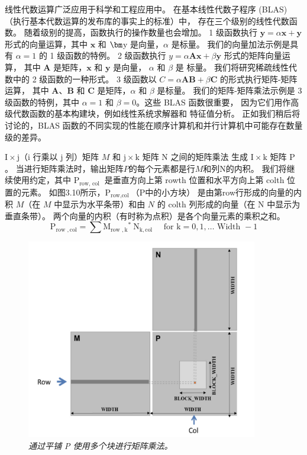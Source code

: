\begin{remark}[线性代数函数]
	线性代数运算广泛应用于科学和工程应用中。 在基本线性代数子程序 (BLAS)（执行基本代数运算的发布库的事实上的标准）中，
	存在三个级别的线性代数函数。 随着级别的提高，函数执行的操作数量也会增加。 
	1 级函数执行 $\bm y = \alpha \bm x+\bm y$ 形式的向量运算，其中 $\bm x$ 和 $\bm $y 是向量，$\alpha$ 是标量。 
	我们的向量加法示例是具有 $\alpha = 1$ 的 1 级函数的特例。
	2 级函数执行 $y = \alpha \bm A\bm x+\beta \bm y$ 形式的矩阵向量运算，
	其中 $\bm A$ 是矩阵，$\bm x$ 和 $\bm y$ 是向量，
	$\alpha$ 和 $\beta$ 是 标量。 我们将研究稀疏线性代数中的 2 级函数的一种形式。 
	3 级函数以 $C = \alpha \bm A\bm B + \beta \bm C$ 的形式执行矩阵-矩阵运算，
	其中 $\bm A$、$\bm B$ 和 $\bm C$ 是矩阵，$\alpha$ 和 $\beta$ 是标量。 
	我们的矩阵-矩阵乘法示例是 3 级函数的特例，其中 $\alpha = 1$ 和 $\beta = 0$。这些 BLAS 函数很重要，
	因为它们用作高级代数函数的基本构建块，例如线性系统求解器和 特征值分析。 
	正如我们稍后将讨论的，BLAS 函数的不同实现的性能在顺序计算机和并行计算机中可能存在数量级的差异。
\end{remark}

$\mathrm{I} \times \mathrm{j}$（$\mathrm{i}$ 行乘以 $\mathrm{j}$ 列）矩阵 $M$ 
和 $\mathrm{j} \times \mathrm{k}$ 矩阵 $\mathrm{N}$ 之间的矩阵乘法
生成 $\mathrm{I} \times \mathrm{k}$ 矩阵 $\mathrm{P}$。 
当进行矩阵乘法时，输出矩阵$P$的每个元素都是行$M$和列$\mathrm{N}$的内积。 
我们将继续使用约定，其中 $\mathrm{P}_{\text {row, col }}$ 是垂直方向上第 rowth 位置和水平方向上第 colth 位置的元素。 
如图3.10所示，$\mathrm{P}_{\text {row,col }}$（$\mathrm{P}$中的小方块）
是由第row行形成的向量的内积 $M$（在 $M$ 中显示为水平条带）和由 $N$ 的 colth 列形成的向量（在 N 中显示为垂直条带）。 
两个向量的内积（有时称为点积）是各个向量元素的乘积之和。
$$
\mathrm{P}_{\text {row }, \mathrm{col}}=\sum \mathrm{M}_{\text {row }, \mathrm{k}}{ }^{*} \mathrm{~N}_{\mathrm{k}, \mathrm{col}} \quad \text { for } \mathrm{k}=0,1, \ldots \text { Width }-1
$$

\begin{figure}[H]
	\centering
	\includegraphics[width=0.9\textwidth]{figs/F3.10.png}
	\caption{\textit{通过平铺 P 使用多个块进行矩阵乘法。}}
\end{figure}

